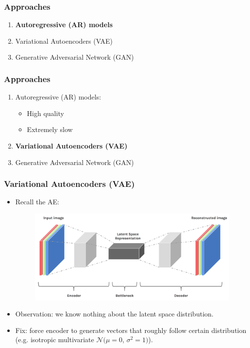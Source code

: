 \documentclass[xcolor=dvipsnames]{beamer}
\begin{document}
\begin{frame}
\frametitle{Approaches}
\begin{enumerate}
	\item \textbf{Autoregressive (AR) models}
	\item Variational Autoencoders (VAE)
	\item Generative Adversarial Network (GAN)
\end{enumerate}
\end{frame}



\begin{frame}
\frametitle{Approaches}
\begin{enumerate}
	\item Autoregressive (AR) models:
		\begin{itemize}
			\item High quality
			\item Extremely slow
		\end{itemize}
	\item \textbf{Variational Autoencoders (VAE)}
	\item Generative Adversarial Network (GAN)
\end{enumerate}
\end{frame}



\begin{frame}
\frametitle{Variational Autoencoders (VAE)}
\begin{itemize}
	\item Recall the AE:
		\begin{figure}
		\includegraphics[width=\linewidth]{img/autoenc.png}	
		\end{figure}
	\item Observation: we know nothing about the latent space distribution.
	\item Fix: force encoder to generate vectors that roughly follow certain distribution (e.g. isotropic multivariate $\mathcal{N}(\mu=0$, $\sigma^2=1)$).
\end{itemize}
\end{frame}
\end{document}
